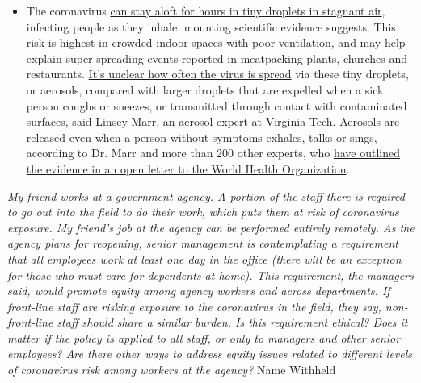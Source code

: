 \begin{itemize}
  \begin{itemize}
  \tightlist
  \item
    The coronavirus
    \href{https://www.nytimes3xbfgragh.onion/2020/07/04/health/239-experts-with-one-big-claim-the-coronavirus-is-airborne.html?action=click\&pgtype=Article\&state=default\&region=MAIN_CONTENT_3\&context=storylines_faq}{can
    stay aloft for hours in tiny droplets in stagnant air}, infecting
    people as they inhale, mounting scientific evidence suggests. This
    risk is highest in crowded indoor spaces with poor ventilation, and
    may help explain super-spreading events reported in meatpacking
    plants, churches and restaurants.
    \href{https://www.nytimes3xbfgragh.onion/2020/07/06/health/coronavirus-airborne-aerosols.html?action=click\&pgtype=Article\&state=default\&region=MAIN_CONTENT_3\&context=storylines_faq}{It's
    unclear how often the virus is spread} via these tiny droplets, or
    aerosols, compared with larger droplets that are expelled when a
    sick person coughs or sneezes, or transmitted through contact with
    contaminated surfaces, said Linsey Marr, an aerosol expert at
    Virginia Tech. Aerosols are released even when a person without
    symptoms exhales, talks or sings, according to Dr. Marr and more
    than 200 other experts, who
    \href{https://academic.oup.com/cid/article/doi/10.1093/cid/ciaa939/5867798}{have
    outlined the evidence in an open letter to the World Health
    Organization}.
  \end{itemize}
\end{itemize}

\emph{My friend works at a government agency. A portion of the staff
there is required to go out into the field to do their work, which puts
them at risk of coronavirus exposure. My friend's job at the agency can
be performed entirely remotely. As the agency plans for reopening,
senior management is contemplating a requirement that all employees work
at least one day in the office (there will be an exception for those who
must care for dependents at home). This requirement, the managers said,
would promote equity among agency workers and across departments. If
front-line staff are risking exposure to the coronavirus in the field,
they say, non-front-line staff should share a similar burden. Is this
requirement ethical? Does it matter if the policy is applied to all
staff, or only to managers and other senior employees? Are there other
ways to address equity issues related to different levels of coronavirus
risk among workers at the agency?} Name Withheld

